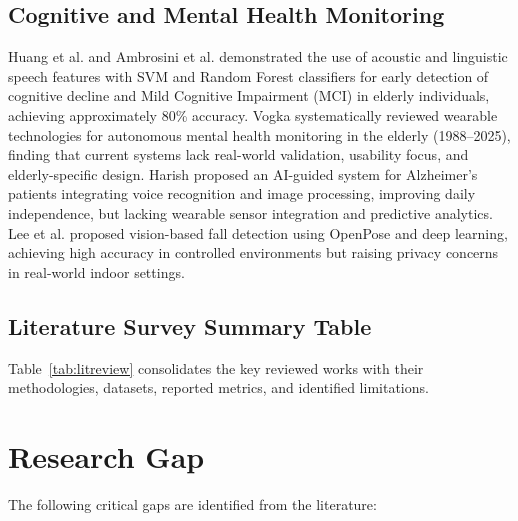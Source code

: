 \documentclass[conference]{IEEEtran}
\begin{document}
\subsection{Cognitive and Mental Health Monitoring}

Huang et al. \cite{b26} and Ambrosini et al. \cite{b27} demonstrated the use of acoustic and linguistic speech features with SVM and Random Forest classifiers for early detection of cognitive decline and Mild Cognitive Impairment (MCI) in elderly individuals, achieving approximately 80\% accuracy. Vogka \cite{b28} systematically reviewed wearable technologies for autonomous mental health monitoring in the elderly (1988--2025), finding that current systems lack real-world validation, usability focus, and elderly-specific design. Harish \cite{b29} proposed an AI-guided system for Alzheimer's patients integrating voice recognition and image processing, improving daily independence, but lacking wearable sensor integration and predictive analytics. Lee et al. \cite{b36} proposed vision-based fall detection using OpenPose and deep learning, achieving high accuracy in controlled environments but raising privacy concerns in real-world indoor settings.

\subsection{Literature Survey Summary Table}

Table~\ref{tab:litreview} consolidates the key reviewed works with their methodologies, datasets, reported metrics, and identified limitations.

\section{Research Gap}

The following critical gaps are identified from the literature:
\end{document}
